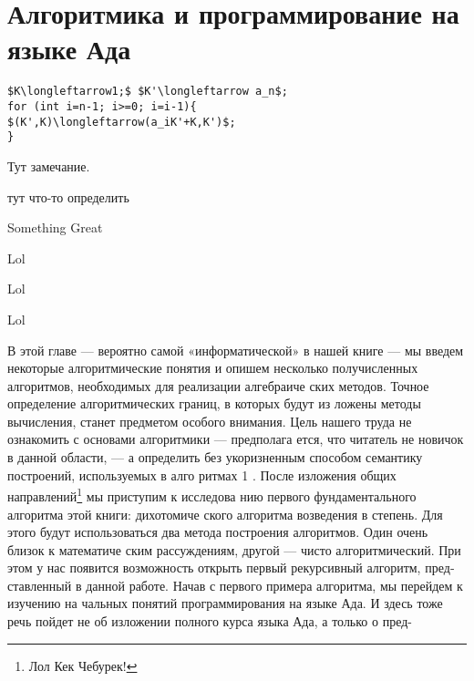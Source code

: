 \documentclass{mai_book}
\begin{document}
\chapter{Алгоритмика и \newline программирование на \newline языке Ада}


\begin{lstlisting}[mathescape=true, caption=Lol]
$K\longleftarrow1;$ $K'\longleftarrow a_n$;
for (int i=n-1; i>=0; i=i-1){
$(K',K)\longleftarrow(a_iK'+K,K')$;
}
\end{lstlisting} 
 
 
\begin{mynotice}
Тут замечание.
\end{mynotice}
 
 
\begin{determ}[Lol]
тут что-то определить
\end{determ}

\begin{thm}
Something Great
\end{thm}

\begin{sled}
Lol
\end{sled}

\begin{bezpodpisi}
Lol
\end{bezpodpisi}

\begin{thm}
Lol
\end{thm}
В этой главе — вероятно самой «информатической» в нашей книге —
мы введем некоторые алгоритмические понятия и опишем несколько
получисленных алгоритмов, необходимых для реализации алгебраиче­
ских методов.
Точное определение алгоритмических границ, в которых будут из­
ложены методы вычисления, станет предметом особого внимания. Цель
нашего труда не ознакомить с основами алгоритмики — предполага­
ется, что читатель не новичок в данной области, — а определить без­
укоризненным способом семантику построений, используемых в алго­
ритмах 1 .
После изложения общих направлений\footnote{Лол Кек Чебурек!} мы приступим к исследова­
нию первого фундаментального алгоритма этой книги: дихотомиче­
ского алгоритма возведения в степень. Для этого будут использоваться
два метода построения алгоритмов. Один очень близок к математиче­
ским рассуждениям, другой — чисто алгоритмический. При этом у нас
появится возможность открыть первый рекурсивный алгоритм, пред­
ставленный в данной работе.
Начав с первого примера алгоритма, мы перейдем к изучению на­
чальных понятий программирования на языке Ада. И здесь тоже речь
пойдет не об изложении полного курса языка Ада, а только о пред-
\end{document}
